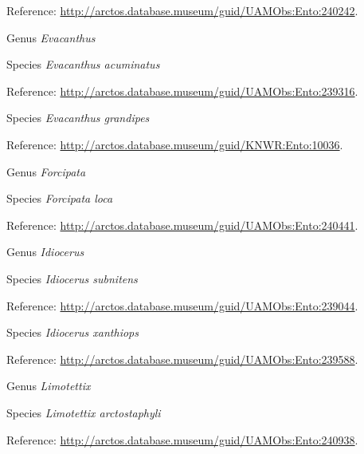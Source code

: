 \documentclass[9pt, article]{memoir}
\begin{document}
\begin{multicols}{2}
Reference: 
\url{http://arctos.database.museum/guid/UAMObs:Ento:240242}.

\vspace{6pt}\noindent\hspace{30pt}Genus \textit{Evacanthus}


\vspace{6pt}\noindent\hspace{36pt}Species \textit{Evacanthus acuminatus}


Reference: 
\url{http://arctos.database.museum/guid/UAMObs:Ento:239316}.

\vspace{6pt}\noindent\hspace{36pt}Species \textit{Evacanthus grandipes}


Reference: 
\url{http://arctos.database.museum/guid/KNWR:Ento:10036}.

\vspace{6pt}\noindent\hspace{30pt}Genus \textit{Forcipata}


\vspace{6pt}\noindent\hspace{36pt}Species \textit{Forcipata loca}


Reference: 
\url{http://arctos.database.museum/guid/UAMObs:Ento:240441}.

\vspace{6pt}\noindent\hspace{30pt}Genus \textit{Idiocerus}


\vspace{6pt}\noindent\hspace{36pt}Species \textit{Idiocerus subnitens}


Reference: 
\url{http://arctos.database.museum/guid/UAMObs:Ento:239044}.

\vspace{6pt}\noindent\hspace{36pt}Species \textit{Idiocerus xanthiops}


Reference: 
\url{http://arctos.database.museum/guid/UAMObs:Ento:239588}.

\vspace{6pt}\noindent\hspace{30pt}Genus \textit{Limotettix}


\vspace{6pt}\noindent\hspace{36pt}Species \textit{Limotettix arctostaphyli}


Reference: 
\url{http://arctos.database.museum/guid/UAMObs:Ento:240938}.


\end{multicols}
\end{document}
